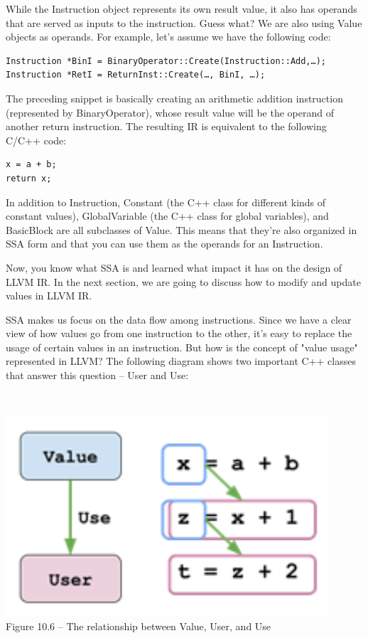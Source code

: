 While the Instruction object represents its own result value, it also has operands that are served as inputs to the instruction. Guess what? We are also using Value objects as operands. For example, let's assume we have the following code:

\begin{lstlisting}[style=styleCXX]
Instruction *BinI = BinaryOperator::Create(Instruction::Add,…);
Instruction *RetI = ReturnInst::Create(…, BinI, …);
\end{lstlisting}

The preceding snippet is basically creating an arithmetic addition instruction (represented by BinaryOperator), whose result value will be the operand of another return instruction. The resulting IR is equivalent to the following C/C++ code:

\begin{lstlisting}[style=styleCXX]
x = a + b;
return x;
\end{lstlisting}

In addition to Instruction, Constant (the C++ class for different kinds of constant values), GlobalVariable (the C++ class for global variables), and BasicBlock are all subclasses of Value. This means that they're also organized in SSA form and that you can use them as the operands for an Instruction.

Now, you know what SSA is and learned what impact it has on the design of LLVM IR. In the next section, we are going to discuss how to modify and update values in LLVM IR.


SSA makes us focus on the data flow among instructions. Since we have a clear view of how values go from one instruction to the other, it's easy to replace the usage of certain values in an instruction. But how is the concept of "value usage" represented in LLVM? The following diagram shows two important C++ classes that answer this question – User and Use:

\hspace*{\fill} \\ %
\begin{center}
\includegraphics[width=0.9\textwidth]{content/3/chapter10/images/6.png}\\
Figure 10.6 – The relationship between Value, User, and Use
\end{center}

